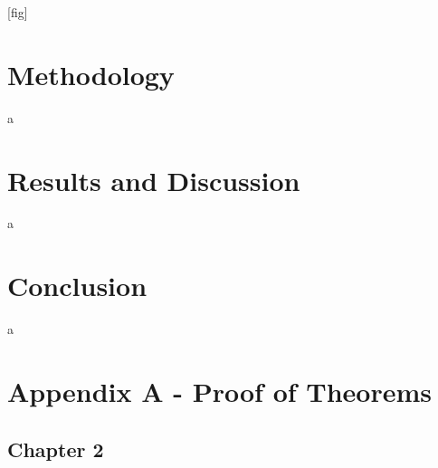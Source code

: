 \documentclass[a4paper,11pt]{book}
\numberwithin{figure}{chapter}
\numberwithin{equation}{chapter}
\numberwithin{table}{chapter}
\theoremstyle{definition}
\begin{document}
[fig]

\clearpage
\chapter{Methodology}

a

\clearpage
\chapter{Results and Discussion}

a

\clearpage
\chapter{Conclusion}

a

\clearpage
{}




\clearpage
{}
\chapter*{Appendix A - Proof of Theorems}

\section*{Chapter 2}
\end{document}
